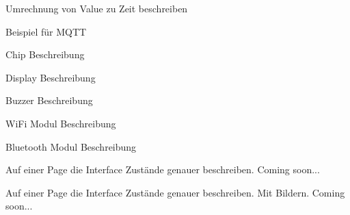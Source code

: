 
\begin{DoxyRefList}
\item[Global \mbox{\hyperlink{pages_8h_a186afb34592e38cfaec9e9cbaa742e96}{line\+\_\+typ\+\_\+e}} ]\label{todo__todo000002}%
%
Umrechnung von Value zu Zeit beschreiben  
\item[Global \mbox{\hyperlink{main_8cpp_aebc98552ff14156db500ed70c8c3410e}{topic\+List}} \mbox{[}\mbox{]}\mbox{[}TOPIC\+\_\+\+LENGTH\mbox{]}]\label{todo__todo000001}%
%
Beispiel für MQTT  
\item[Seite \mbox{\hyperlink{page_wio_terminal}{WIO Terminal}} ]\label{todo__todo000006}%
%
Chip Beschreibung

\label{todo__todo000007}%
%
Display Beschreibung

\label{todo__todo000008}%
%
Buzzer Beschreibung

\label{todo__todo000009}%
%
Wi\+Fi Modul Beschreibung 



Bluetooth Modul Beschreibung 
\item[Datei \mbox{\hyperlink{wio__display_8cpp}{wio\+\_\+display.cpp}} ]\label{todo__todo000003}%
%
Auf einer Page die Interface Zustände genauer beschreiben. Coming soon...  
\item[Global \mbox{\hyperlink{classwio__display_a352d2e9825a7f7c51a7936ec5c4bcd8a}{wio\+\_\+display\+::update\+Interface\+Status}} ()]\label{todo__todo000004}%
%
Auf einer Page die Interface Zustände genauer beschreiben. Mit Bildern. Coming soon...
\end{DoxyRefList}
